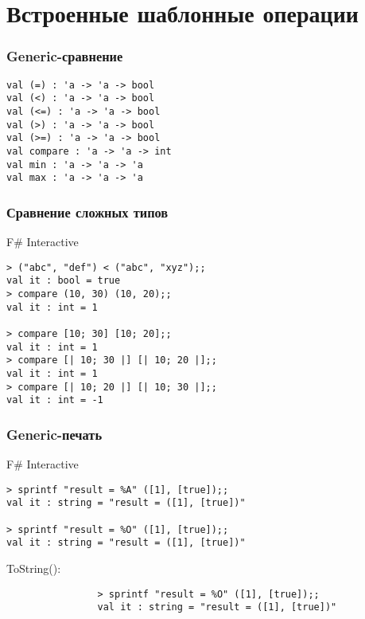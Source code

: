 \documentclass[xetex,mathserif,serif]{beamer}
\begin{document}
    \section{Встроенные шаблонные операции}

    \begin{frame}[fragile]
        \frametitle{Generic-сравнение}
        \begin{verbatim}
val (=) : 'a -> 'a -> bool
val (<) : 'a -> 'a -> bool
val (<=) : 'a -> 'a -> bool
val (>) : 'a -> 'a -> bool
val (>=) : 'a -> 'a -> bool
val compare : 'a -> 'a -> int
val min : 'a -> 'a -> 'a
val max : 'a -> 'a -> 'a
        \end{verbatim}
    \end{frame}

    \begin{frame}[fragile]
        \frametitle{Сравнение сложных типов}
        \begin{alertblock}{F\# Interactive}
            \begin{verbatim}
> ("abc", "def") < ("abc", "xyz");;
val it : bool = true
> compare (10, 30) (10, 20);;
val it : int = 1

> compare [10; 30] [10; 20];;
val it : int = 1
> compare [| 10; 30 |] [| 10; 20 |];;
val it : int = 1
> compare [| 10; 20 |] [| 10; 30 |];;
val it : int = -1
            \end{verbatim}
        \end{alertblock}
    \end{frame}

    \begin{frame}[fragile]
        \frametitle{Generic-печать}
        \begin{alertblock}{F\# Interactive}
            \begin{verbatim}
> sprintf "result = %A" ([1], [true]);;
val it : string = "result = ([1], [true])"

> sprintf "result = %O" ([1], [true]);;
val it : string = "result = ([1], [true])"
            \end{verbatim}
            \vspace{3mm}
            ToString():
            \begin{verbatim}
                > sprintf "result = %O" ([1], [true]);;
                val it : string = "result = ([1], [true])"
            \end{verbatim}
        \end{alertblock}
    \end{frame}
\end{document}
